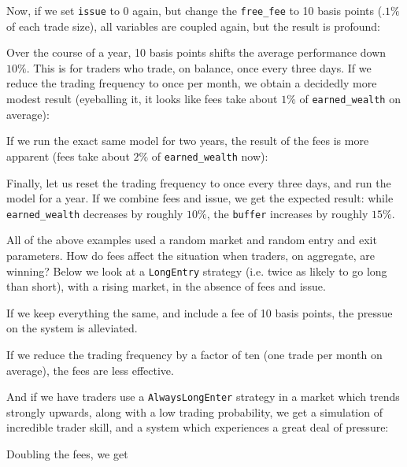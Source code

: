 \documentclass[11pt]{article}
\begin{document}
    

    Now, if we set \texttt{issue} to 0 again, but change the
\texttt{free\_fee} to 10 basis points (\(.1\%\) of each trade size), all
variables are coupled again, but the result is profound:

    

    Over the course of a year, 10 basis points shifts the average
performance down \(10\%\). This is for traders who trade, on balance,
once every three days. If we reduce the trading frequency to once per
month, we obtain a decidedly more modest result (eyeballing it, it looks
like fees take about \(1\%\) of \texttt{earned\_wealth} on average):

    

    If we run the exact same model for two years, the result of the fees is
more apparent (fees take about \(2\%\) of \texttt{earned\_wealth} now):

    

    Finally, let us reset the trading frequency to once every three days,
and run the model for a year. If we combine fees and issue, we get the
expected result: while \texttt{earned\_wealth} decreases by roughly
\(10\%\), the \texttt{buffer} increases by roughly \(15\%\).

    

    All of the above examples used a random market and random entry and exit
parameters. How do fees affect the situation when traders, on aggregate,
are winning? Below we look at a \texttt{LongEntry} strategy (i.e. twice
as likely to go long than short), with a rising market, in the absence
of fees and issue.

    

    If we keep everything the same, and include a fee of 10 basis points,
the pressue on the system is alleviated.

    

    If we reduce the trading frequency by a factor of ten (one trade per
month on average), the fees are less effective.

    

    And if we have traders use a \texttt{AlwaysLongEnter} strategy in a
market which trends strongly upwards, along with a low trading
probability, we get a simulation of incredible trader skill, and a
system which experiences a great deal of pressure:

    

    Doubling the fees, we get

    
\end{document}

